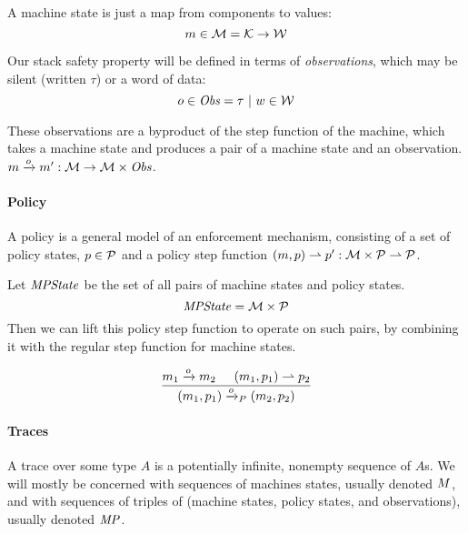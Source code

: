 \documentclass[acmsmall,review,anonymous]{acmart}\settopmatter{printfolios=true,printccs=false,printacmref=false}
\begin{document}
A machine state is just a map from components to values:
%
\[m \in {\mathcal M} = {\mathcal K} \rightarrow {\mathcal W}\]


Our stack safety property will be defined in terms of {\em observations}, which may be
silent (written $\tau$) or a word of data:
%
\[o \in \mathit{Obs} = \tau ~ | ~ w \in {\mathcal W}\]

These observations are a byproduct of the step function of the
machine, which takes a machine state and produces a pair of a
machine state and an observation.
%
\(m \xrightarrow{o} m' : {\mathcal M} \rightarrow {\mathcal M} \times \mathit{Obs} \).

\paragraph*{Policy}
    
A policy is a general model of an enforcement mechanism, consisting of
a set of policy states, \(p \in \mathcal{P}\) and a policy step function
\((m, p) \rightharpoonup p' : {\mathcal M} \times \mathcal{P}
\rightharpoonup \mathcal{P}\).


Let $\mathit{MPState}$ be the set of all pairs of machine states and policy states.
%
\[\mathit{MPState} = {\mathcal M} \times \mathcal{P}\]
%
Then we can lift this policy step function to operate on such pairs,
by combining it with the regular step function for machine states.


    \[\frac{m_1 \xrightarrow{o} m_2 \hspace{.5cm} (m_1, p_1) \rightharpoonup p_2}
           {(m_1,p_1) \xrightarrow{o}_P (m_2,p_2)}\]

\paragraph{Traces}

A trace over some type $A$ is a potentially infinite, nonempty
sequence of $A$s. We will mostly be concerned with sequences of
machines states, usually denoted $M$, and with sequences of
triples of (machine states, policy states, and observations), usually
denoted $\mathit{MP}$.
\end{document}
